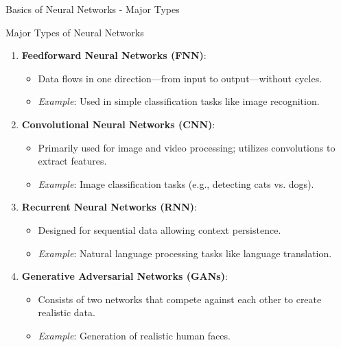\documentclass[aspectratio=169]{beamer}
\begin{document}
\begin{frame}[fragile]{Basics of Neural Networks - Major Types}
    \begin{block}{Major Types of Neural Networks}
        \begin{enumerate}
            \item \textbf{Feedforward Neural Networks (FNN)}:
                \begin{itemize}
                    \item Data flows in one direction—from input to output—without cycles.
                    \item \textit{Example}: Used in simple classification tasks like image recognition.
                \end{itemize}
            \item \textbf{Convolutional Neural Networks (CNN)}:
                \begin{itemize}
                    \item Primarily used for image and video processing; utilizes convolutions to extract features.
                    \item \textit{Example}: Image classification tasks (e.g., detecting cats vs. dogs).
                \end{itemize}
            \item \textbf{Recurrent Neural Networks (RNN)}:
                \begin{itemize}
                    \item Designed for sequential data allowing context persistence.
                    \item \textit{Example}: Natural language processing tasks like language translation.
                \end{itemize}
            \item \textbf{Generative Adversarial Networks (GANs)}:
                \begin{itemize}
                    \item Consists of two networks that compete against each other to create realistic data.
                    \item \textit{Example}: Generation of realistic human faces.
                \end{itemize}
        \end{enumerate}
    \end{block}
\end{frame}
\end{document}
